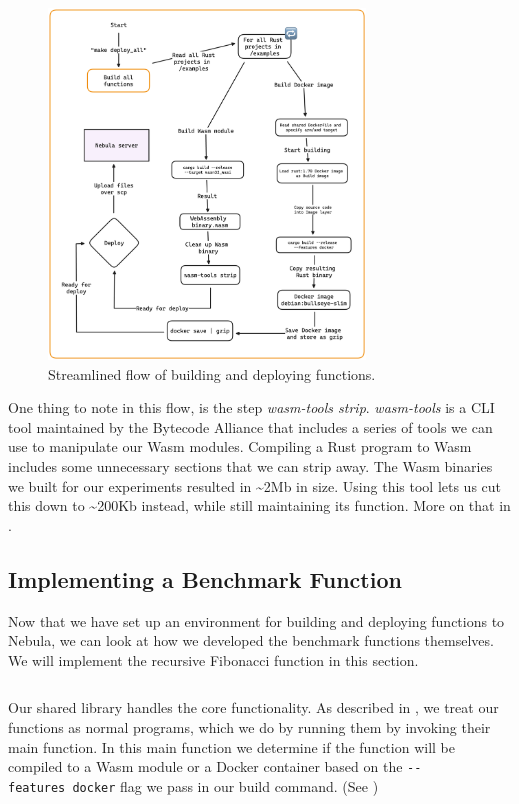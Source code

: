 \documentclass[
  table]{report}
\begin{document}
\begin{figure}[H]
\centering
  \includegraphics[width=0.75\textwidth]{assets/6-build_deploy_functions.png}
  \caption{Streamlined flow of building and deploying functions.}
  \label{fig:build_deploy_function}
\end{figure}

One thing to note in this flow, is the step \emph{wasm-tools strip}.
\emph{wasm-tools} is a CLI tool maintained by the Bytecode Alliance that
includes a series of tools we can use to manipulate our \ac{Wasm}
modules. Compiling a Rust program to \ac{Wasm} includes some unnecessary
sections that we can strip away. The \ac{Wasm} binaries we built for our
experiments resulted in \textasciitilde2Mb in size. Using this tool lets
us cut this down to \textasciitilde200Kb instead, while still
maintaining its function. More on that in .

\subsection{Implementing a Benchmark Function}

Now that we have set up an environment for building and deploying
functions to Nebula, we can look at how we developed the benchmark
functions themselves. We will implement the recursive Fibonacci function
in this section.

\inputminted{rust}{assets/code/fib-recursive.rs}

Our shared library handles the core functionality. As described in
, we treat our functions as normal
programs, which we do by running them by invoking their main function.
In this main function we determine if the function will be compiled to a
\ac{Wasm} module or a Docker container based on the
\texttt{-\/-features\ docker} flag we pass in our build command. (See
)
\end{document}
